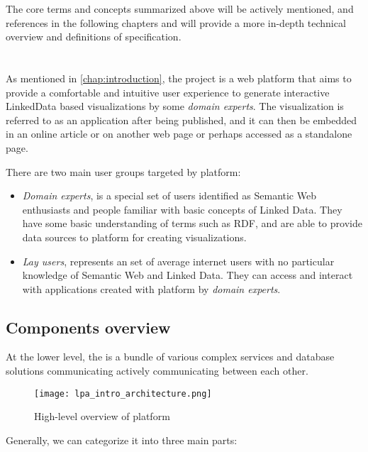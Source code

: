 The core terms and concepts summarized above will be actively mentioned, and references in the following chapters and will provide a more in-depth technical overview and definitions of \solid{} specification. 

\section{\lpa{}}

As mentioned in \autoref{chap:introduction}, the \lpa{} project is a web platform that aims to provide a comfortable and intuitive user experience to generate interactive LinkedData based visualizations by some \textit{domain experts}. The visualization is referred to as an application after being published, and it can then be embedded in an online article or on another web page or perhaps accessed as a standalone page. 

There are two main user groups targeted by \lpa{} platform:
\begin{itemize}
	\item \textit{Domain experts}, is a special set of users identified as Semantic Web enthusiasts and people familiar with basic concepts of Linked Data. They have some basic understanding of terms such as RDF, and are able to provide data sources to \lpa{} platform for creating visualizations.
	\item \textit{Lay users}, represents an set of average internet users with no particular knowledge of Semantic Web and Linked Data. They can access and interact with applications created with \lpa{} platform by \textit{domain experts}.
\end{itemize}

\subsection{Components overview}
\label{sssec:lpa_preliminaries_component_overview}

At the lower level, the \lpa{} is a bundle of various complex services and database solutions communicating actively communicating between each other. 

\begin{figure}[h]
    \centering
    \texttt{[image: lpa\_intro\_architecture.png]}
    \caption{High-level overview of \lpa{} platform}
    \label{fig:lpa_intro_architecture}
\end{figure}

Generally, we can categorize it into three main parts: 

